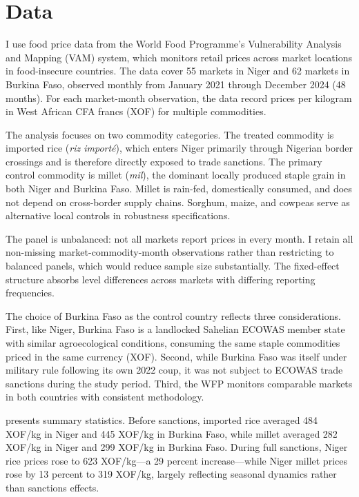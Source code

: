 \documentclass[12pt]{article}
\begin{document}
\section{Data}

I use food price data from the World Food Programme's Vulnerability Analysis and Mapping (VAM) system, which monitors retail prices across market locations in food-insecure countries. The data cover 55 markets in Niger and 62 markets in Burkina Faso, observed monthly from January 2021 through December 2024 (48 months). For each market-month observation, the data record prices per kilogram in West African CFA francs (XOF) for multiple commodities.

The analysis focuses on two commodity categories. The treated commodity is imported rice (\textit{riz import\'e}), which enters Niger primarily through Nigerian border crossings and is therefore directly exposed to trade sanctions. The primary control commodity is millet (\textit{mil}), the dominant locally produced staple grain in both Niger and Burkina Faso. Millet is rain-fed, domestically consumed, and does not depend on cross-border supply chains. Sorghum, maize, and cowpeas serve as alternative local controls in robustness specifications.

The panel is unbalanced: not all markets report prices in every month. I retain all non-missing market-commodity-month observations rather than restricting to balanced panels, which would reduce sample size substantially. The fixed-effect structure absorbs level differences across markets with differing reporting frequencies.

The choice of Burkina Faso as the control country reflects three considerations. First, like Niger, Burkina Faso is a landlocked Sahelian ECOWAS member state with similar agroecological conditions, consuming the same staple commodities priced in the same currency (XOF). Second, while Burkina Faso was itself under military rule following its own 2022 coup, it was not subject to ECOWAS trade sanctions during the study period. Third, the WFP monitors comparable markets in both countries with consistent methodology.

 presents summary statistics. Before sanctions, imported rice averaged 484 XOF/kg in Niger and 445 XOF/kg in Burkina Faso, while millet averaged 282 XOF/kg in Niger and 299 XOF/kg in Burkina Faso. During full sanctions, Niger rice prices rose to 623 XOF/kg---a 29 percent increase---while Niger millet prices rose by 13 percent to 319 XOF/kg, largely reflecting seasonal dynamics rather than sanctions effects.
\end{document}
